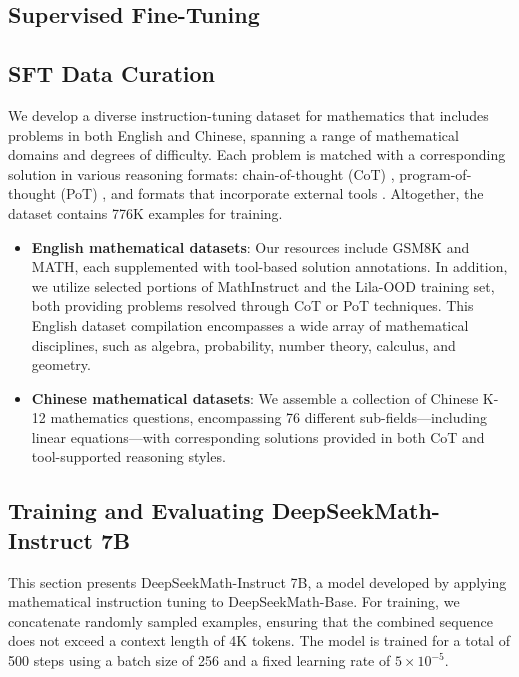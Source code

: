 \begin{itemize}[topsep=0pt]
\section{Supervised Fine-Tuning}

\subsection{SFT Data Curation}

We develop a diverse instruction-tuning dataset for mathematics that includes problems in both English and Chinese, spanning a range of mathematical domains and degrees of difficulty. Each problem is matched with a corresponding solution in various reasoning formats: chain-of-thought (CoT) \citep{cot}, program-of-thought (PoT) \citep{pot,pal}, and formats that incorporate external tools \citep{tora}. Altogether, the dataset contains 776K examples for training.

\begin{itemize}[topsep=0pt]
    \item \textbf{English mathematical datasets}: Our resources include GSM8K and MATH, each supplemented with tool-based solution annotations. In addition, we utilize selected portions of MathInstruct \citep{MathInstruct} and the Lila-OOD \citep{lila} training set, both providing problems resolved through CoT or PoT techniques. This English dataset compilation encompasses a wide array of mathematical disciplines, such as algebra, probability, number theory, calculus, and geometry.
    \item \textbf{Chinese mathematical datasets}: We assemble a collection of Chinese K-12 mathematics questions, encompassing 76 different sub-fields—including linear equations—with corresponding solutions provided in both CoT and tool-supported reasoning styles.
\end{itemize}

\subsection{Training and Evaluating DeepSeekMath-Instruct 7B}

This section presents DeepSeekMath-Instruct 7B, a model developed by applying mathematical instruction tuning to DeepSeekMath-Base. For training, we concatenate randomly sampled examples, ensuring that the combined sequence does not exceed a context length of 4K tokens. The model is trained for a total of 500 steps using a batch size of 256 and a fixed learning rate of $5 \times 10^{-5}$.


\end{itemize}
